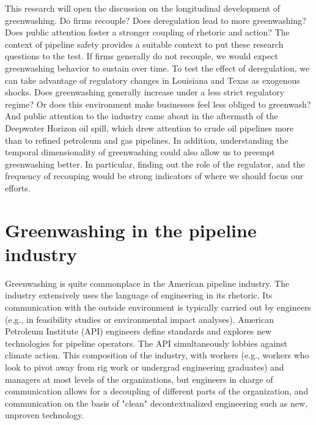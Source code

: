 \documentclass[12pt, man, natbib]{apa6}
\begin{document}
	This research will open the discussion on the longitudinal development of greenwashing. Do firms recouple? Does deregulation lead to more greenwashing? Does public attention foster a stronger coupling of rhetoric and action? The context of pipeline safety provides a suitable context to put these research questions to the test. If firms generally do not recouple, we would expect greenwashing behavior to sustain over time. To test the effect of deregulation, we can take advantage of regulatory changes in Louisiana and Texas as exogenous shocks. Does greenwashing generally increase under a less strict regulatory regime? Or does this environment make businesses feel less obliged to greenwash? And public attention to the industry came about in the aftermath of the Deepwater Horizon oil spill, which drew attention to crude oil pipelines more than to refined petroleum and gas pipelines. In addition, understanding the temporal dimensionality of greenwashing could also allow us to preempt greenwashing better. In particular, finding out the role of the regulator, and the frequency of recouping would be strong indicators of where we should focus our efforts.
	
	
	\section{Greenwashing in the pipeline industry}
	
	Greenwashing is quite commonplace in the American pipeline industry. The industry extensively uses the language of engineering in its rhetoric. Its communication with the outside environment is typically carried out by engineers (e.g., in feasibility studies or environmental impact analyses). American Petroleum Institute (API) engineers define standards and explores new technologies for pipeline operators. The API simultaneously lobbies against climate action. This composition of the industry, with workers (e.g., workers who look to pivot away from rig work or undergrad engineering graduates) and managers at most levels of the organizations, but engineers in charge of communication allows for a decoupling of different parts of the organization, and communication on the basis of "clean" decontextualized engineering such as new, unproven technology.
	
\end{document}

